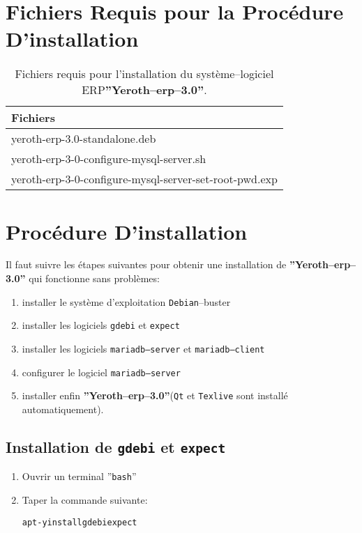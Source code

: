 \documentclass[a4paper, 10pt]{article}
\newcommand{\yerotherptroiszero}{\textbf{''Yeroth--erp--3.0''}\xspace}
\newcommand{\texlive}{\texttt{Texlive}\xspace}
\newcommand{\gdebi}{\texttt{gdebi}\xspace}
\newcommand{\expect}{\texttt{expect}\xspace}
\newcommand{\debian}{\texttt{Debian}\xspace}
\newcommand{\bash}{\texttt{bash}\xspace}
\newcommand{\qt}{\texttt{Qt}\xspace}
\newcommand{\mariadbserver}{\texttt{mariadb--server}\xspace}
\newcommand{\mariadbclient}{\texttt{mariadb--client}\xspace}
\newcommand{\erp}{syst\`eme--logiciel ERP\xspace}
\newcommand{\rootcommand}[1]{
\begin{center}
\textcolor{purplish}{#1\xspace}
\end{center}}
\begin{document}
\section{Fichiers Requis pour la Proc\'edure D'installation}

\begin{table}[!htbp]
\centering
\begin{tabular}{|l|} \hline
\textbf{Fichiers}		\\ \hline
yeroth-erp-3.0-standalone.deb							\\ \hline
yeroth-erp-3-0-configure-mysql-server.sh				\\ \hline	
yeroth-erp-3-0-configure-mysql-server-set-root-pwd.exp	\\ \hline	
\end{tabular}
\caption{Fichiers requis pour l'installation du
	 \erp \yerotherptroiszero.}
\label{tab:prerequisite-software}
\end{table}

\section{Proc\'edure D'installation}

Il faut suivre les \'etapes suivantes pour obtenir
une installation de \yerotherptroiszero qui fonctionne
sans probl\`emes:

\begin{enumerate} [1)]
	\item installer le syst\`eme d'exploitation \debian--buster
	\item installer les logiciels \gdebi et \expect
	\item installer les logiciels \mariadbserver et \mariadbclient
	\item configurer le logiciel \mariadbserver
	\item installer enfin \yerotherptroiszero (\qt et \texlive sont install\'e automatiquement).
\end{enumerate}

\subsection{Installation de \gdebi et \expect}

\begin{enumerate}[1)]
	\item Ouvrir un terminal ''\bash''
	\item Taper la commande suivante:
		\begin{alltt}
			\rootcommand{apt -y install gdebi expect}
		\end{alltt}
\end{enumerate} 
\end{document}
